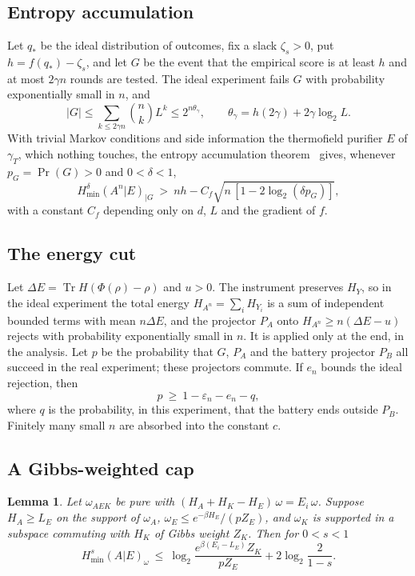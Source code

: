 \documentclass[11pt]{article}
\newtheorem{lemma}[theorem]{Lemma}
\theoremstyle{definition}
\theoremstyle{remark}
\newcommand{\Tr}{\operatorname{Tr}}
\begin{document}
\subsection{Entropy accumulation}

Let $q_*$ be the ideal distribution of outcomes, fix a slack $\zeta_s>0$, put $h=f(q_*)-\zeta_s$, and let $G$ be the event that the empirical score is at least $h$ and at most $2\gamma n$ rounds are tested. The ideal experiment fails $G$ with probability exponentially small in $n$, and
\[
|G|\le\sum_{k\le2\gamma n}\binom nk L^k\le2^{n\theta_\gamma},\qquad\theta_\gamma=h(2\gamma)+2\gamma\log_2L.
\]
With trivial Markov conditions and side information the thermofield purifier $E$ of $\gamma_T$, which nothing touches, the entropy accumulation theorem~\cite{DFR20} gives, whenever $p_G=\Pr(G)>0$ and $0<\delta<1$,
\begin{equation}\label{eq:eat}
H_{\min}^\delta(A^n|E)_{|G}\ >\ nh-C_f\sqrt{n\,[1-2\log_2(\delta p_G)]},
\end{equation}
with a constant $C_f$ depending only on $d$, $L$ and the gradient of $f$.

\subsection{The energy cut}

Let $\Delta E=\Tr H(\Phi(\rho)-\rho)$ and $u>0$. The instrument preserves $H_Y$, so in the ideal experiment the total energy $H_{A^n}=\sum_iH_{Y_i}$ is a sum of independent bounded terms with mean $n\Delta E$, and the projector $P_A$ onto $H_{A^n}\ge n(\Delta E-u)$ rejects with probability exponentially small in $n$. It is applied only at the end, in the analysis. Let $p$ be the probability that $G$, $P_A$ and the battery projector $P_B$ all succeed in the real experiment; these projectors commute. If $e_n$ bounds the ideal rejection, then
\begin{equation}\label{eq:p}
p\ \ge\ 1-\varepsilon_n-e_n-q,
\end{equation}
where $q$ is the probability, in this experiment, that the battery ends outside $P_B$. Finitely many small $n$ are absorbed into the constant $c$.

\subsection{A Gibbs-weighted cap}

\begin{lemma}\label{lem:cap}
Let $\omega_{AEK}$ be pure with $(H_A+H_K-H_E)\,\omega=E_i\,\omega$. Suppose $H_A\ge L_E$ on the support of $\omega_A$, $\omega_E\le e^{-\beta H_E}/(pZ_E)$, and $\omega_K$ is supported in a subspace commuting with $H_K$ of Gibbs weight $Z_K$. Then for $0<s<1$
\[
H^s_{\min}(A|E)_\omega\ \le\ \log_2\frac{e^{\beta(E_i-L_E)}Z_K}{pZ_E}+2\log_2\frac2{1-s}.
\]
\end{lemma}
\end{document}
